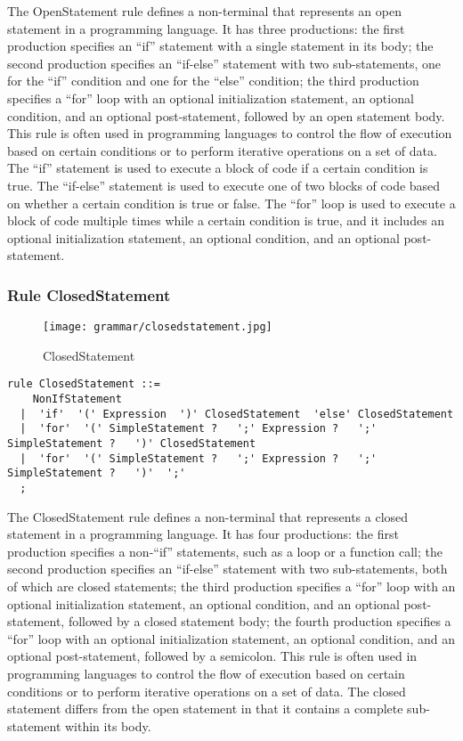 The OpenStatement rule defines a non-terminal that represents an open statement in a programming language. It has three productions: the first production specifies an ``if'' statement with a single statement in its body; the second production specifies an ``if-else'' statement with two sub-statements, one for the ``if'' condition and one for the ``else'' condition; the third production specifies a ``for'' loop with an optional initialization statement, an optional condition, and an optional post-statement, followed by an open statement body. This rule is often used in programming languages to control the flow of execution based on certain conditions or to perform iterative operations on a set of data. The ``if'' statement is used to execute a block of code if a certain condition is true. The ``if-else'' statement is used to execute one of two blocks of code based on whether a certain condition is true or false. The ``for'' loop is used to execute a block of code multiple times while a certain condition is true, and it includes an optional initialization statement, an optional condition, and an optional post-statement.

\subsubsection*{Rule ClosedStatement}

\begin{figure}
\centering
\texttt{[image: grammar/closedstatement.jpg]}
\caption{ClosedStatement}
\end{figure}

\begin{lstlisting}
rule ClosedStatement ::=
    NonIfStatement 
  |  'if'  '(' Expression  ')' ClosedStatement  'else' ClosedStatement 
  |  'for'  '(' SimpleStatement ?   ';' Expression ?   ';' SimpleStatement ?   ')' ClosedStatement 
  |  'for'  '(' SimpleStatement ?   ';' Expression ?   ';' SimpleStatement ?   ')'  ';' 
  ;
\end{lstlisting}

The ClosedStatement rule defines a non-terminal that represents a closed statement in a programming language. It has four productions: the first production specifies a non-``if'' statements, such as a loop or a function call; the second production specifies an ``if-else'' statement with two sub-statements, both of which are closed statements; the third production specifies a ``for'' loop with an optional initialization statement, an optional condition, and an optional post-statement, followed by a closed statement body; the fourth production specifies a ``for'' loop with an optional initialization statement, an optional condition, and an optional post-statement, followed by a semicolon. This rule is often used in programming languages to control the flow of execution based on certain conditions or to perform iterative operations on a set of data. The closed statement differs from the open statement in that it contains a complete sub-statement within its body.

